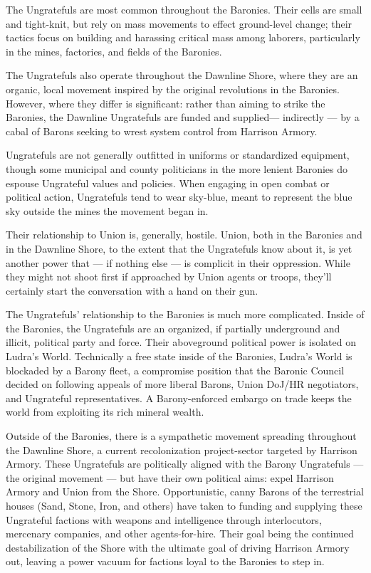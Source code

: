The Ungratefuls are most common throughout the Baronies. Their cells are small and tight-knit,
but rely on mass movements to effect ground-level change; their tactics focus on building and
harassing critical mass among laborers, particularly in the mines, factories, and fields of the
Baronies.


The Ungratefuls also operate throughout the Dawnline Shore, where they are an organic, local
movement inspired by the original revolutions in the Baronies. However, where they differ is
significant: rather than aiming to strike the Baronies, the Dawnline Ungratefuls are funded and
supplied— indirectly — by a cabal of Barons seeking to wrest system control from Harrison
Armory.


Ungratefuls are not generally outfitted in uniforms or standardized equipment, though some
municipal and county politicians in the more lenient Baronies do espouse Ungrateful values and
policies. When engaging in open combat or political action, Ungratefuls tend to wear sky-blue,
meant to represent the blue sky outside the mines the movement began in.


Their relationship to Union is, generally, hostile. Union, both in the Baronies and in the Dawnline
Shore, to the extent that the Ungratefuls know about it, is yet another power that — if nothing
else — is complicit in their oppression. While they might not shoot first if approached by Union
agents or troops, they’ll certainly start the conversation with a hand on their gun.


The Ungratefuls’ relationship to the Baronies is much more complicated. Inside of the Baronies,
the Ungratefuls are an organized, if partially underground and illicit, political party and force.
Their aboveground political power is isolated on Ludra’s World. Technically a free state inside of
the Baronies, Ludra’s World is blockaded by a Barony fleet, a compromise position that the
Baronic Council decided on following appeals of more liberal Barons, Union DoJ/HR negotiators,
and Ungrateful representatives. A Barony-enforced embargo on trade keeps the world from
exploiting its rich mineral wealth.


Outside of the Baronies, there is a sympathetic movement spreading throughout the Dawnline
Shore, a current recolonization project-sector targeted by Harrison Armory. These Ungratefuls
are politically aligned with the Barony Ungratefuls — the original movement — but have their own
political aims: expel Harrison Armory and Union from the Shore. Opportunistic, canny Barons of
the terrestrial houses (Sand, Stone, Iron, and others) have taken to funding and supplying these
Ungrateful factions with weapons and intelligence through interlocutors, mercenary companies,
and other agents-for-hire. Their goal being the continued destabilization of the Shore with the
ultimate goal of driving Harrison Armory out, leaving a power vacuum for factions loyal to the
Baronies to step in.



